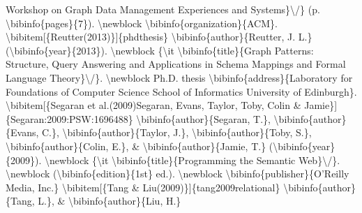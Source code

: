 \documentclass{article}%
\begin{document}
Workshop on Graph Data Management Experiences and Systems\}\textbackslash{}/\}\newline%
(p. \textbackslash{}bibinfo\{pages\}\{7\}).\newline%
\textbackslash{}newblock \textbackslash{}bibinfo\{organization\}\{ACM\}.\newline%
\textbackslash{}bibitem{[}\{Reutter(2013)\}{]}\{phdthesis\}\newline%
\textbackslash{}bibinfo\{author\}\{Reutter, J. L.\} (\textbackslash{}bibinfo\{year\}\{2013\}).\newline%
\textbackslash{}newblock \{\textbackslash{}it \textbackslash{}bibinfo\{title\}\{Graph Patterns: Structure, Query Answering and\newline%
Applications in Schema Mappings and Formal Language Theory\}\textbackslash{}/\}.\newline%
\textbackslash{}newblock Ph.D. thesis\newline%
\textbackslash{}bibinfo\{address\}\{Laboratory for Foundations of Computer Science School of\newline%
Informatics University of Edinburgh\}.\newline%
\textbackslash{}bibitem{[}\{Segaran et al.(2009)Segaran, Evans, Taylor, Toby, Colin \&\newline%
Jamie\}{]}\{Segaran:2009:PSW:1696488\}\newline%
\textbackslash{}bibinfo\{author\}\{Segaran, T.\}, \textbackslash{}bibinfo\{author\}\{Evans, C.\},\newline%
\textbackslash{}bibinfo\{author\}\{Taylor, J.\}, \textbackslash{}bibinfo\{author\}\{Toby, S.\},\newline%
\textbackslash{}bibinfo\{author\}\{Colin, E.\}, \& \textbackslash{}bibinfo\{author\}\{Jamie, T.\}\newline%
(\textbackslash{}bibinfo\{year\}\{2009\}).\newline%
\textbackslash{}newblock \{\textbackslash{}it \textbackslash{}bibinfo\{title\}\{Programming the Semantic Web\}\textbackslash{}/\}.\newline%
\textbackslash{}newblock (\textbackslash{}bibinfo\{edition\}\{1st\} ed.).\newline%
\textbackslash{}newblock \textbackslash{}bibinfo\{publisher\}\{O'Reilly Media, Inc.\}\newline%
\textbackslash{}bibitem{[}\{Tang \& Liu(2009)\}{]}\{tang2009relational\}\newline%
\textbackslash{}bibinfo\{author\}\{Tang, L.\}, \& \textbackslash{}bibinfo\{author\}\{Liu, H.\}\newline%
\end{document}
